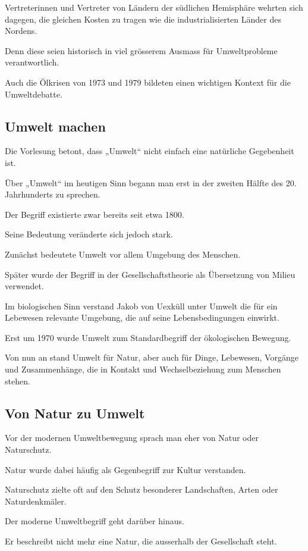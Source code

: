 Vertreterinnen und Vertreter
von Ländern der südlichen Hemisphäre
wehrten sich dagegen,
die gleichen Kosten zu tragen
wie die industrialisierten Länder des Nordens.

Denn diese seien historisch
in viel grösserem Ausmass
für Umweltprobleme verantwortlich.

Auch die Ölkrisen von 1973 und 1979
bildeten einen wichtigen Kontext
für die Umweltdebatte.

\subsection{Umwelt machen}

Die Vorlesung betont,
dass „Umwelt“ nicht einfach
eine natürliche Gegebenheit ist.

Über „Umwelt“ im heutigen Sinn
begann man erst in der zweiten Hälfte
des 20. Jahrhunderts zu sprechen.

Der Begriff existierte zwar bereits seit etwa 1800.

Seine Bedeutung veränderte sich jedoch stark.

Zunächst bedeutete Umwelt
vor allem Umgebung des Menschen.

Später wurde der Begriff
in der Gesellschaftstheorie
als Übersetzung von Milieu verwendet.

Im biologischen Sinn verstand Jakob von Uexküll
unter Umwelt die für ein Lebewesen relevante Umgebung,
die auf seine Lebensbedingungen einwirkt.

Erst um 1970 wurde Umwelt
zum Standardbegriff der ökologischen Bewegung.

Von nun an stand Umwelt
für Natur,
aber auch für Dinge,
Lebewesen,
Vorgänge
und Zusammenhänge,
die in Kontakt und Wechselbeziehung
zum Menschen stehen.

\subsection{Von Natur zu Umwelt}

Vor der modernen Umweltbewegung
sprach man eher von Natur
oder Naturschutz.

Natur wurde dabei häufig
als Gegenbegriff zur Kultur verstanden.

Naturschutz zielte oft auf den Schutz
besonderer Landschaften,
Arten
oder Naturdenkmäler.

Der moderne Umweltbegriff
geht darüber hinaus.

Er beschreibt nicht mehr eine Natur,
die ausserhalb der Gesellschaft steht.

